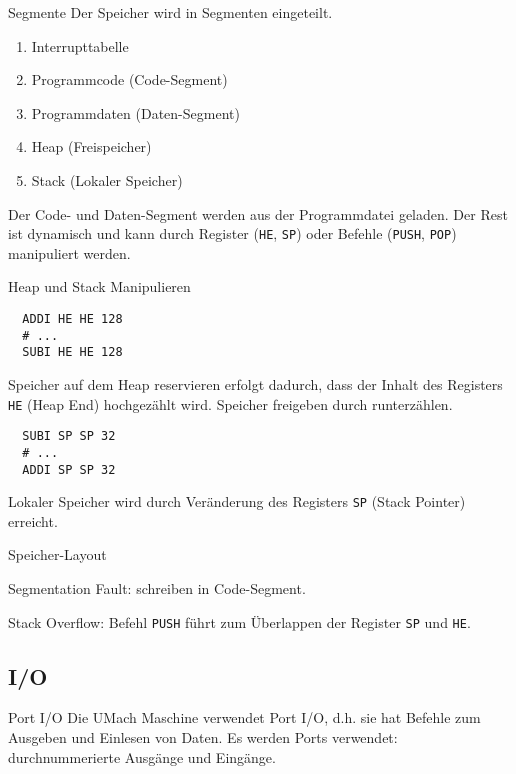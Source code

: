 \begin{frame}{Segmente}
 Der Speicher wird in Segmenten eingeteilt.
 \begin{enumerate}
  \item Interrupttabelle
  \item Programmcode (Code-Segment)
  \item Programmdaten (Daten-Segment)
  \item Heap (Freispeicher)
  \item Stack (Lokaler Speicher)
 \end{enumerate}
 Der Code- und Daten-Segment werden aus der Programmdatei geladen. 
 Der Rest ist dynamisch und kann durch Register (\texttt{HE}, \texttt{SP})
 oder Befehle (\texttt{PUSH}, \texttt{POP}) manipuliert werden.
\end{frame}


\begin{frame}[fragile]{Heap und Stack Manipulieren}
 \begin{lstlisting}
  ADDI HE HE 128
  # ...
  SUBI HE HE 128
 \end{lstlisting}
 Speicher auf dem Heap reservieren erfolgt dadurch, dass der Inhalt des
 Registers \texttt{HE} (Heap End) hochgezählt wird. Speicher freigeben durch
 runterzählen.
 
 \begin{lstlisting}
  SUBI SP SP 32
  # ...
  ADDI SP SP 32
 \end{lstlisting}
 Lokaler Speicher wird durch Veränderung des Registers \texttt{SP} (Stack
 Pointer) erreicht.
\end{frame}


\begin{frame}{Speicher-Layout}
 \begin{center}
  
 \end{center}
 Segmentation Fault: schreiben in Code-Segment.
 
 Stack Overflow: Befehl \texttt{PUSH} führt zum Überlappen der Register
\texttt{SP} und \texttt{HE}.
\end{frame}



\subsection{I/O}

\begin{frame}{Port I/O}
 Die UMach Maschine verwendet Port I/O, d.h. sie hat Befehle zum Ausgeben und
 Einlesen von Daten. Es werden Ports verwendet: durchnummerierte Ausgänge und
 Eingänge.
\end{frame}

